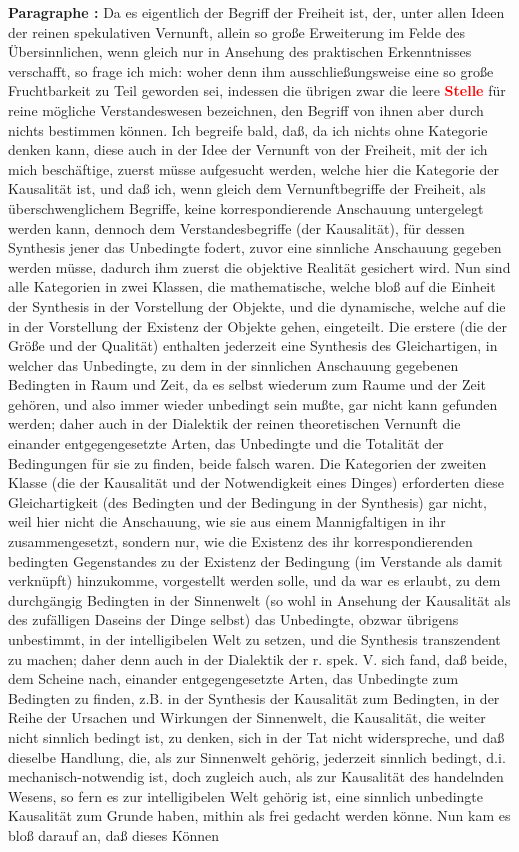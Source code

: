 \documentclass[a4paper,12pt,twoside]{book}
\newcommand{\match}[1]{\textcolor{red}{\textbf{#1}}}
\begin{document}
	\noindent\textbf{Paragraphe : }Da es eigentlich der Begriff der Freiheit ist, der, unter allen Ideen der reinen spekulativen Vernunft, allein so große Erweiterung im Felde des Übersinnlichen, wenn gleich nur in Ansehung des praktischen Erkenntnisses verschafft, so frage ich mich: woher denn ihm ausschließungsweise eine so große Fruchtbarkeit zu Teil geworden sei, indessen die übrigen zwar die leere \match{Stelle} für reine mögliche Verstandeswesen bezeichnen, den Begriff von ihnen aber durch nichts bestimmen können. Ich begreife bald, daß, da ich nichts ohne Kategorie denken kann, diese auch in der Idee der Vernunft von der Freiheit, mit der ich mich beschäftige, zuerst müsse aufgesucht werden, welche hier die Kategorie der Kausalität ist, und daß ich, wenn gleich dem Vernunftbegriffe der Freiheit, als überschwenglichem Begriffe, keine korrespondierende Anschauung untergelegt werden kann, dennoch dem Verstandesbegriffe (der Kausalität), für dessen Synthesis jener das Unbedingte fodert, zuvor eine sinnliche Anschauung gegeben werden müsse, dadurch ihm zuerst die objektive Realität gesichert wird. Nun sind alle Kategorien in zwei Klassen, die mathematische, welche bloß auf die Einheit der Synthesis in der Vorstellung der Objekte, und die dynamische, welche auf die in der Vorstellung der Existenz der Objekte gehen, eingeteilt. Die erstere (die der Größe und der Qualität) enthalten jederzeit eine Synthesis des Gleichartigen, in welcher das Unbedingte, zu dem in der sinnlichen Anschauung gegebenen Bedingten in Raum und Zeit, da es selbst wiederum zum Raume und der Zeit gehören, und also  immer wieder unbedingt sein mußte, gar nicht kann gefunden werden; daher auch in der Dialektik der reinen theoretischen Vernunft die einander entgegengesetzte Arten, das Unbedingte und die Totalität der Bedingungen für sie zu finden, beide falsch waren. Die Kategorien der zweiten Klasse (die der Kausalität und der Notwendigkeit eines Dinges) erforderten diese Gleichartigkeit (des Bedingten und der Bedingung in der Synthesis) gar nicht, weil hier nicht die Anschauung, wie sie aus einem Mannigfaltigen in ihr zusammengesetzt, sondern nur, wie die Existenz des ihr korrespondierenden bedingten Gegenstandes zu der Existenz der Bedingung (im Verstande als damit verknüpft) hinzukomme, vorgestellt werden solle, und da war es erlaubt, zu dem durchgängig Bedingten in der Sinnenwelt (so wohl in Ansehung der Kausalität als des zufälligen Daseins der Dinge selbst) das Unbedingte, obzwar übrigens unbestimmt, in der intelligibelen Welt zu setzen, und die Synthesis transzendent zu machen; daher denn auch in der Dialektik der r. spek. V. sich fand, daß beide, dem Scheine nach, einander entgegengesetzte Arten, das Unbedingte zum Bedingten zu finden, z.B. in der Synthesis der Kausalität zum Bedingten, in der Reihe der Ursachen und Wirkungen der Sinnenwelt, die Kausalität, die weiter nicht sinnlich bedingt ist, zu denken, sich in der Tat nicht widerspreche, und daß dieselbe Handlung, die, als zur Sinnenwelt gehörig, jederzeit sinnlich bedingt, d.i. mechanisch-notwendig ist, doch zugleich auch, als zur Kausalität des handelnden Wesens, so fern es zur intelligibelen Welt gehörig ist, eine sinnlich unbedingte Kausalität zum Grunde haben, mithin als frei gedacht werden könne. Nun kam es bloß darauf an, daß dieses Können 
\end{document}

